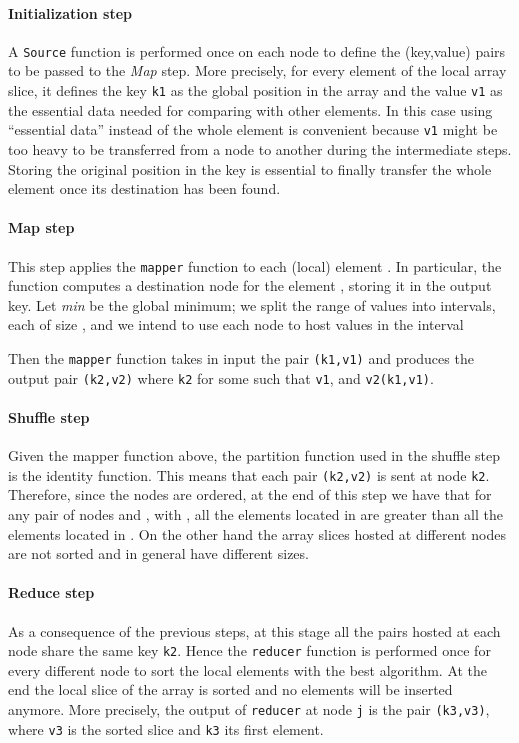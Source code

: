 \documentclass[a4paper]{article}
\numberwithin{equation}{section}
\begin{document}
\paragraph{Initialization step}
A \verb+Source+ function is performed once on each node to define the
(key,value) pairs to be passed to the \emph{Map} step. 
More precisely, for every element  of the local array slice, it defines the key \verb+k1+ as the 
global position 
in the array and the value \verb+v1+ as the essential data needed
for comparing  with other elements. 
In this case using ``essential data'' instead of the whole
element is convenient because \verb+v1+ might be too heavy to
be transferred from a node to another during the intermediate steps. 
Storing the original position in the key is essential to finally
transfer the whole element once its destination has been found.  

\paragraph{Map step}
This step applies the \verb+mapper+ function to each (local) element
. In particular, the function computes a destination node for the
element , storing it in the output key.
Let {\it min} be the global minimum; we split the range of values
into  intervals, each of size
, 
and we intend to use each node  to host values in the interval 

Then the \verb+mapper+ function takes in input the pair 
\verb+(k1+\verb+,v1+\verb+)+ and produces the output pair
\verb+(k2+\verb+,v2+\verb+)+ where
\verb+k2+ for some  such that 
\verb+v1+, and
\verb+v2+\verb+(k1+\verb+,v1+\verb+)+.  
\paragraph{Shuffle step}
Given the mapper function above, the partition function used in the
shuffle step is the identity function. This means that each pair
\verb+(k2+\verb+,v2)+ is sent at node \verb+k2+.
Therefore, since the nodes are
ordered, at the end of this step we have that for any pair
of nodes  and , with , all the elements located in 
are greater than all the elements located in . On the other hand
the array slices hosted at different nodes are not sorted
and in general have different sizes. 

\paragraph{Reduce step}
As a consequence of the previous steps, at this stage all the pairs
hosted at each node share the same key \verb+k2+.
Hence the \verb+reducer+ function is performed once for every
different node to sort the local elements with the best algorithm.
At the end the local slice of the array is sorted and no 
elements will be inserted anymore. More precisely, the output of
\verb+reducer+ 
at node \verb+j+ is the pair \verb+(k3+\verb+,v3+\verb+)+,
where \verb+v3+ is the sorted slice and \verb+k3+ its first
element.  
\end{document}
